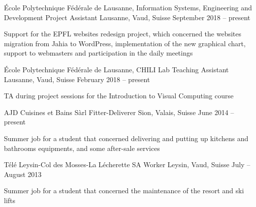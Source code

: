 

\begin{cventries}


	\cventry
	{École Polytechnique Fédérale de Lausanne, Information Systems, Engineering and Development}
	{Project Assistant}
	{Lausanne, Vaud, Suisse}
	{September 2018 -- present}
	{\begin{cvitems}
			\item{Support for the EPFL websites redesign project, which concerned the websites migration from Jahia to WordPress, implementation of the new graphical chart, support to webmasters and participation in the daily meetings}
		\end{cvitems}}

	\cventry
	{École Polytechnique Fédérale de Lausanne, CHILI Lab}
	{Teaching Assistant}
	{Lausanne, Vaud, Suisse}
	{February 2018 -- present}
	{\begin{cvitems}
			\item{TA during project sessions for the Introduction to Visual Computing course}
		\end{cvitems}}

	\cventry
	{AJD Cuisines et Bains Sàrl}
	{Fitter-Deliverer}
	{Sion, Valais, Suisse}
	{June 2014 -- present}
	{\begin{cvitems}
			\item{Summer job for a student that concerned delivering and putting up kitchens and bathrooms equipments, and some after-sale services}
		\end{cvitems}}

	\cventry
	{Télé Leysin-Col des Mosses-La Lécherette SA}
	{Worker}
	{Leysin, Vaud, Suisse}
	{July -- August 2013}
	{\begin{cvitems}
			\item{Summer job for a student that concerned the maintenance of the resort and ski lifts}
		\end{cvitems}}









\end{cventries}
